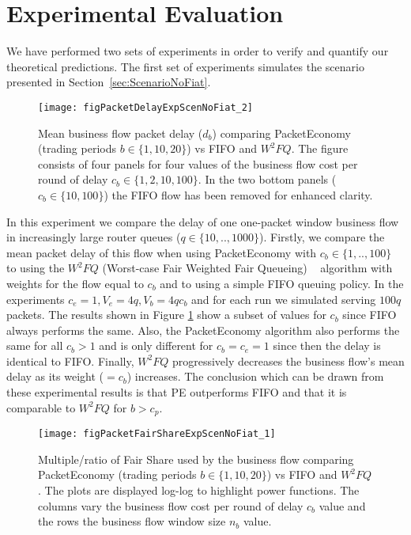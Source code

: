\documentclass[letterpaper,10pt]{llncs}
\newcommand{\hla}[1]{\hl{#1}}
\renewcommand{\hla}[1]{#1}
\begin{document}
\section{Experimental Evaluation}
\label{sec:exp}

We have performed \hla{two} sets of experiments in order to verify and quantify our theoretical predictions. The first set of experiments simulates the scenario presented in Section~\ref{sec:ScenarioNoFiat}.


\begin{figure}[h!]
\centering
\texttt{[image: figPacketDelayExpScenNoFiat\_2]}
\caption{Mean business flow packet delay ($d_b$) comparing PacketEconomy (trading periods $b\in\{1,10,20\}$) vs FIFO and $W^{2}FQ$. The figure consists of four panels for four values of the business flow cost per round of delay $c_b\in\{1,2,10,100\}$. In the two bottom panels ($c_b\in\{10,100\}$) the FIFO flow has been removed for enhanced clarity.}
\label{fig:ExpDelay}
\end{figure}




In this experiment we compare the delay of one one-packet window business flow in increasingly large router queues ($q\in\{10,..,1000\}$). Firstly, we compare the mean packet delay of this flow when using PacketEconomy with $c_b\in\{1,..,100\}$  to using the $W^{2}FQ$ (Worst-case Fair Weighted Fair Queueing) ~\cite{BZW2FQ} algorithm with weights for the flow equal to $c_b$  and to using a simple FIFO queuing policy. In the experiments $c_e=1, V_e=4q, V_b=4qc_b$ and for each run we simulated serving $100q$ packets. The results shown in Figure \ref{fig:ExpDelay} show a subset of values for $c_b$ since FIFO always performs the same. Also, the PacketEconomy algorithm also performs the same for all $c_b>1$ and is only different for $c_b=c_e=1$ since then the delay is identical to FIFO. Finally, $W^{2}FQ$ progressively decreases the business flow's mean delay as its weight ($=c_b$) increases. The conclusion which can be drawn from these experimental results is that PE outperforms FIFO and that it is comparable to $W^{2}FQ$ for \hla{$b>c_p$}.


\begin{figure}[h!]
\centering
\texttt{[image: figPacketFairShareExpScenNoFiat\_1]}
\caption{Multiple/ratio of Fair Share used by the business flow comparing PacketEconomy (trading periods $b\in\{1,10,20\}$) vs FIFO and $W^{2}FQ$. The plots are displayed log-log to highlight power functions. The columns vary the business flow cost per round of delay $c_b$ value and the rows the business flow window size $n_b$ value.}
\label{fig:ExpFairShare}
\end{figure}
\end{document}
